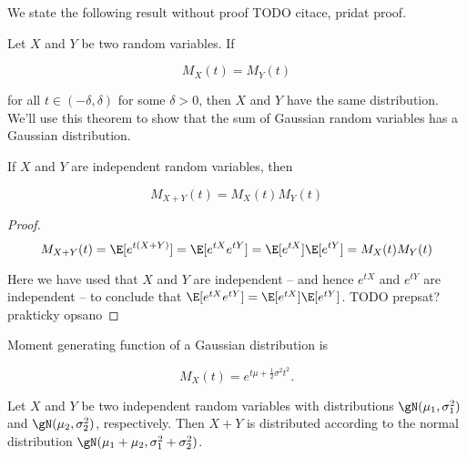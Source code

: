 We state the following result without proof {TODO citace, pridat proof}.

\begin{thm}
  Let $X$ and $Y$ be two random variables. If

  \begin{equation}
    M_X(t) = M_Y(t)
  \end{equation}

  for all $t \in (-\delta, \delta)$ for some $\delta > 0$, then $X$ and $Y$
  have the same distribution. We'll use this theorem to show that the sum of
  Gaussian random variables has a Gaussian distribution.
\end{thm}

\begin{thm}
  \citep{mitzenmacher2017probability}\label{thm:sum-independent-gaussian}
  If $X$ and $Y$ are independent random variables, then

  \begin{equation}
    M_{X + Y}(t) = M_X(t) M_Y(t)
  \end{equation}

  \begin{proof}
    \begin{equation}
      M_{X + Y}(t) = \E[e^{t(X + Y)}] = \E[e^{tX} e^{tY}] = \E[e^{tX}] \E[e^{tY}] = M_X(t) M_Y(t)
    \end{equation}

    Here we have used that $X$ and $Y$ are independent -- and hence
    $e^{tX}$ and $e^{tY}$ are independent -- to conclude that $\E[e^{tX}
    e^{tY}] = \E[e^{tX}] \E[e^{tY}]$. {TODO prepsat? prakticky opsano}
  \end{proof}
\end{thm}


\begin{thm}
  Moment generating function of a Gaussian distribution is

  \begin{equation}
    M_X(t) = e^{t \mu + \frac{1}{2}\sigma^2 t^2}.
  \end{equation}
\end{thm}

\begin{thm}
  Let $X$ and $Y$ be two independent random variables with distributions
  $\gN(\mu_1, \sigma_1^2)$ and $\gN(\mu_2, \sigma_2^2)$, respectively. Then
  $X + Y$ is distributed according to the normal distribution $\gN(\mu_1 +
  \mu_2, \sigma_1^2 + \sigma_2^2)$.

\end{thm}

